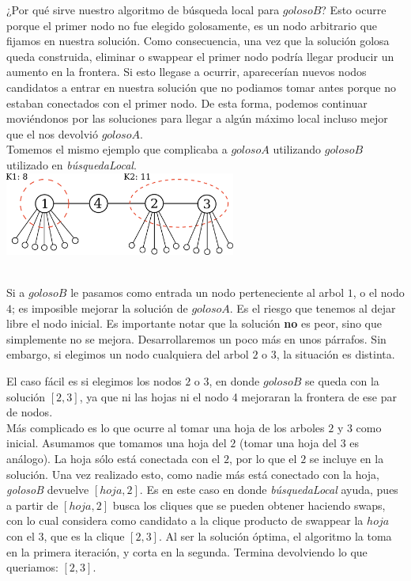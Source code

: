 ¿Por qué sirve nuestro algoritmo de búsqueda local para $golosoB$? Esto ocurre porque el primer nodo no fue elegido golosamente, es un nodo arbitrario que fijamos en nuestra solución. Como consecuencia, una vez que la solución golosa queda construida, eliminar o swappear el primer nodo podría llegar producir un aumento en la frontera. Si esto llegase a ocurrir, aparecerían nuevos nodos candidatos a entrar en nuestra solución que no podiamos tomar antes porque no estaban conectados con el primer nodo. De esta forma, podemos continuar moviéndonos por las soluciones para llegar a algún máximo local incluso mejor que el nos devolvió $golosoA$. \\

Tomemos el mismo ejemplo que complicaba a $golosoA$ utilizando $golosoB$ utilizado en \textit{búsquedaLocal}. \\

{\centering
    \includegraphics[width=0.57\textwidth]{informe/imgs/greedy_base_nodes_v2.png} \\
}
$ $\newline

Si a $golosoB$ le pasamos como entrada un nodo perteneciente al arbol $1$, o el nodo $4$; es imposible mejorar la solución de $golosoA$. Es el riesgo que tenemos al dejar libre el nodo inicial. Es importante notar que la solución \textbf{no} es peor, sino que simplemente no se mejora. Desarrollaremos un poco más en unos párrafos. Sin embargo, si elegimos un nodo cualquiera del arbol $2$ o $3$, la situación es distinta. \\


El caso fácil es si elegimos los nodos $2$ o $3$, en donde $golosoB$ se queda con la solución $[2,3]$, ya que ni las hojas ni el nodo 4 mejoraran la frontera de ese par de nodos. \\

Más complicado es lo que ocurre al tomar una hoja de los arboles $2$ y $3$ como inicial. Asumamos que tomamos una hoja del $2$ (tomar una hoja del $3$ es análogo). La hoja sólo está conectada con el $2$, por lo que el $2$ se incluye en la solución. Una vez realizado esto, como nadie más está conectado con la hoja, \textit{golosoB} devuelve $[hoja,2]$. Es en este caso en donde \textit{búsquedaLocal} ayuda, pues a partir de $[hoja,2]$ busca los cliques que se pueden obtener haciendo swaps, con lo cual considera como candidato a la clique producto de swappear la $hoja$ con el $3$, que es la clique $[2,3]$. Al ser la solución óptima, el algoritmo la toma en la primera iteración, y corta en la segunda. Termina devolviendo lo que queriamos: $[2,3]$. \\

